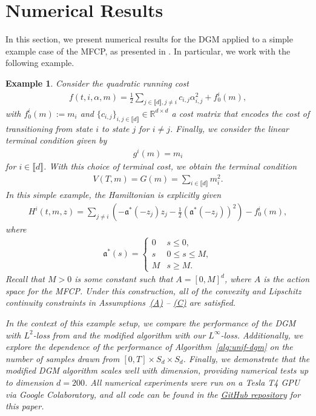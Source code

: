 \documentclass[11pt,reqno]{amsart}
\numberwithin{equation}{section}
\theoremstyle{plain}
\newtheorem{example}[theorem]{Example}
\newcommand{\R}{\mathbb{R}}
\newcommand{\lbrs}[1]{\llbracket #1 \rrbracket}
\begin{document}
\section{Numerical Results}\label{sec:numerical-tests}
In this section, we present numerical results for the DGM applied to a simple example case of the MFCP, as presented in \cite[Example 2]{mfcp}. In particular, we work with the following example.
\begin{example}
\normalfont
Consider the quadratic running cost
\begin{align*}
    f(t, i, \alpha, m) = \frac{1}{2} \sum_{j\in\lbrs{d}, j \neq i} c_{i,j} \alpha_{i,j}^2 + f_0^i(m),
\end{align*}
with $f_0^i(m):= m_i$ and $\{c_{i,j}\}_{i,j \in \lbrs{d}} \in \R^{d \times d}$ a cost matrix that encodes the cost of transitioning from state $i$ to state $j$ for $i \neq j$. Finally, we consider the linear terminal condition given by
\begin{align*}
    g^i(m) = m_i
\end{align*}
for $i \in \lbrs{d}$. With this choice of terminal cost, we obtain the terminal condition
\begin{align*}
    V(T, m) = G(m) = \sum_{i \in \lbrs{d}} m_i^2.
\end{align*}
In this simple example, the Hamiltonian is explicitly given 
\begin{align*}
    H^i(t,m,z) = \sum_{j \neq i} \left(-\mathfrak{a}^*(-z_j)z_j - \frac{1}{2}(\mathfrak{a}^*(-z_j))^2\right) - f_0^i(m),
\end{align*}
where
\begin{align*}
    \mathfrak{a}^*(s) = \begin{cases}
    0 & s \leq 0, \\
    s & 0 \leq s \leq M, \\
    M & s \geq M.
    \end{cases}
\end{align*}
Recall that $M > 0$ is some constant such that $A = [0, M]^d$, where $A$ is the action space for the MFCP. Under this construction, all of the convexity and Lipschitz continuity constraints in Assumptions~\hyperref[a:mfcp-A]{(A)} -- \hyperref[a:mfcp-C]{(C)} are satisfied.

In the context of this example setup, we compare the performance of the DGM with $L^2$-loss from \cite{dgm} and the modified algorithm with our $L^\infty$-loss. Additionally, we explore the dependence of the performance of Algorithm~\ref{alg:unif-dgm} on the number of samples drawn from $[0, T] \times S_d \times S_d$. Finally, we demonstrate that the modified DGM algorithm scales well with dimension, providing numerical tests up to dimension $d = 200$. All numerical experiments were run on a Tesla T4 GPU via Google Colaboratory, and all code can be found in the \href{https://github.com/jakehofgard/jax-dgm}{GitHub repository} for this paper. 


\end{example}
\end{document}
